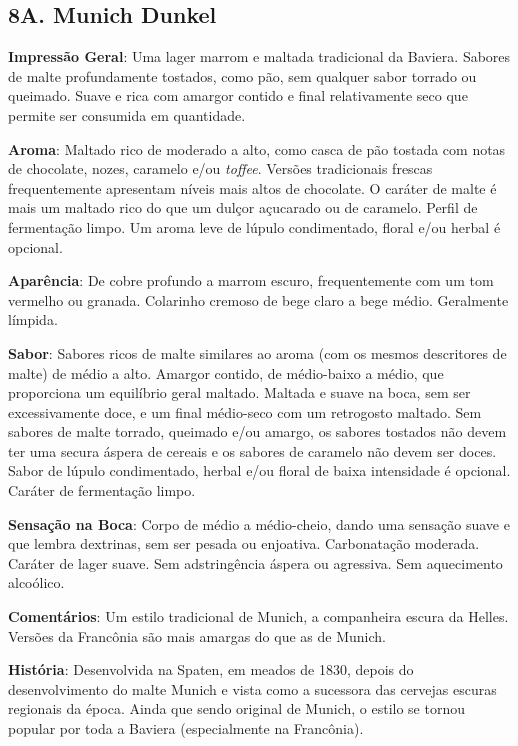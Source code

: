 \subsection*{8A. Munich Dunkel}
\textbf{Impressão Geral}: Uma lager marrom e maltada tradicional da Baviera. Sabores de malte profundamente tostados, como pão, sem qualquer sabor torrado ou queimado. Suave e rica com amargor contido e final relativamente seco que permite ser consumida em quantidade.

\textbf{Aroma}: Maltado rico de moderado a alto, como casca de pão tostada com notas de chocolate, nozes, caramelo e/ou \textit{toffee}. Versões tradicionais frescas frequentemente apresentam níveis mais altos de chocolate. O caráter de malte é mais um maltado rico do que um dulçor açucarado ou de caramelo. Perfil de fermentação limpo. Um aroma leve de lúpulo condimentado, floral e/ou herbal é opcional.

\textbf{Aparência}: De cobre profundo a marrom escuro, frequentemente com um tom vermelho ou granada. Colarinho cremoso de bege claro a bege médio. Geralmente límpida.

\textbf{Sabor}: Sabores ricos de malte similares ao aroma (com os mesmos descritores de malte) de médio a alto. Amargor contido, de médio-baixo a médio, que proporciona um equilíbrio geral maltado. Maltada e suave na boca, sem ser excessivamente doce, e um final médio-seco com um retrogosto maltado. Sem sabores de malte torrado, queimado e/ou amargo, os sabores tostados não devem ter uma secura áspera de cereais e os sabores de caramelo não devem ser doces. Sabor de lúpulo condimentado, herbal e/ou floral de baixa intensidade é opcional. Caráter de fermentação limpo.

\textbf{Sensação na Boca}: Corpo de médio a médio-cheio, dando uma sensação suave e que lembra dextrinas, sem ser pesada ou enjoativa. Carbonatação moderada. Caráter de lager suave. Sem adstringência áspera ou agressiva. Sem aquecimento alcoólico.

\textbf{Comentários}: Um estilo tradicional de Munich, a companheira escura da Helles. Versões da Francônia são mais amargas do que as de Munich.

\textbf{História}: Desenvolvida na Spaten, em meados de 1830, depois do desenvolvimento do malte Munich e vista como a sucessora das cervejas escuras regionais da época. Ainda que sendo original de Munich, o estilo se tornou popular por toda a Baviera (especialmente na Francônia).

